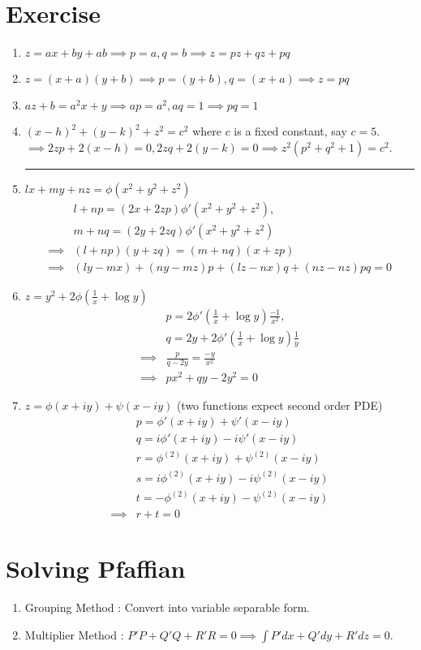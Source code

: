 \section{Exercise}
\begin{enumerate}
	\item $z = ax+by+ab \implies p = a, q=b \implies z = pz+qz+pq$
	\item $z = (x+a)(y+b) \implies p = (y+b),q = (x+a) \implies z = pq$
	\item $az+b = a^2x + y \implies ap = a^2,aq=1 \implies pq = 1$
	\item $(x-h)^2 + (y-k)^2 + z^2 = c^2$ where $c$ is a fixed constant, say $c = 5$.\\
		$\implies 2zp + 2(x-h) = 0, 2zq + 2(y-k) = 0 \implies z^2(p^2 + q^2 + 1) = c^2$.
	\hrule
\item $lx+my+nz = \phi(x^2+y^2+z^2)$ 
\begin{align*}
	& l+np = (2x+2zp)\phi'(x^2+y^2+z^2),\\
	& m+nq  = (2y+2zq)\phi'(x^2+y^2+z^2) \\
	\implies & (l+np)(y+zq)  = (m+nq)(x+zp) \\
	\implies & (ly-mx)+(ny-mz)p + (lz-nx)q + (nz-nz)pq = 0
\end{align*}
\item $z = y^2 + 2\phi(\frac{1}{x} + \log y)$ 
\begin{align*}
	& p = 2\phi'(\frac{1}{x}+\log y) \frac{-1}{x^2},\\
	& q = 2y + 2\phi'(\frac{1}{x} + \log y) \frac{1}{y}\\
	\implies & \frac{p}{q-2y} = \frac{-y}{x^2}\\
	\implies & px^2+qy-2y^2 = 0
\end{align*}
\item $z = \phi(x+iy)+\psi(x-iy)$ (two functions expect second order PDE)
\begin{align*}
	& p = \phi'(x+iy) + \psi'(x-iy)\\
	& q = i\phi'(x+iy) -i \psi'(x-iy)\\
	& r = \phi^{(2)}(x+iy) + \psi^{(2)}(x-iy) \\
	& s = i\phi^{(2)}(x+iy) -i \psi^{(2)}(x-iy) \\
	& t = -\phi^{(2)}(x+iy) -\psi^{(2)}(x-iy)\\
	\implies & r+t = 0
\end{align*}
\end{enumerate}

\section{Solving Pfaffian}
\begin{enumerate}
	\item Grouping Method : Convert into variable separable form.
	\item Multiplier Method : $P'P+Q'Q+R'R = 0 \implies \int P'dx + Q'dy + R'dz = 0$.
\end{enumerate}

